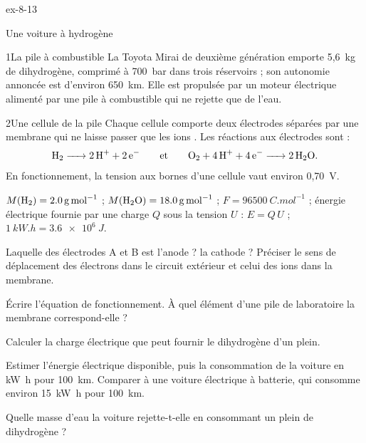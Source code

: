 \begin{blocLivre}{ex-8-13}
\begin{exercice}[3]{Une voiture à hydrogène}
\begin{docu}{1}{La pile à combustible}
La Toyota Mirai de deuxième génération emporte 5,6~kg de dihydrogène, comprimé à 700~bar dans trois réservoirs ; son
autonomie annoncée est d'environ 650~km. Elle est propulsée par un moteur électrique alimenté par une pile à combustible
qui ne rejette que de l'eau.
\end{docu}
\begin{docu}{2}{Une cellule de la pile}
Chaque cellule comporte deux électrodes séparées par une membrane qui ne laisse passer que les ions . Les
réactions aux électrodes sont :
\[\ce{H2 -> 2 H+ + 2 e-}\qquad\text{et}\qquad\ce{O2 + 4 H+ + 4 e- -> 2 H2O}.\]
En fonctionnement, la tension aux bornes d'une cellule vaut environ 0,70~V.
\end{docu}
\begin{donnees}
$M(\ce{H2})=\qty{2,0}{g.mol^{-1}}$ ; $M(\ce{H2O})=\qty{18,0}{g.mol^{-1}}$ ; $F=\qty{96500}{C.mol^{-1}}$ ; énergie électrique
fournie par une charge $Q$ sous la tension $U$ : $E=Q\,U$ ; \mbox{$\qty{1}{kW.h}=\qty{3,6e6}{J}$}.
\end{donnees}
\begin{questions}
\item Laquelle des électrodes A et B est l'anode ? la cathode ? Préciser le sens de déplacement des électrons dans le
circuit extérieur et celui des ions  dans la membrane.
\item Écrire l'équation de fonctionnement. À quel élément d'une pile de laboratoire la membrane correspond-elle ?
\item Calculer la charge électrique que peut fournir le dihydrogène d'un plein.
\item \initiative Estimer l'énergie électrique disponible, puis la consommation de la voiture en \unit{kW.h} pour 100~km.
Comparer à une voiture électrique à batterie, qui consomme environ \qty{15}{kW.h} pour 100~km.
\item Quelle masse d'eau la voiture rejette-t-elle en consommant un plein de dihydrogène ?
\end{questions}
\end{exercice}
\end{blocLivre}
